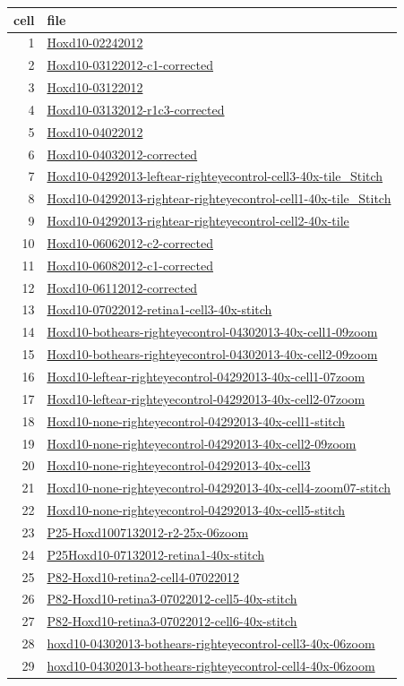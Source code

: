 \documentclass{article}
\begin{document}
\begin{table}
  \centering
  \begin{tabular}{rl}
    \toprule
    cell & file \\
    \midrule
1& \url{Hoxd10-02242012} \\
2& \url{Hoxd10-03122012-c1-corrected} \\
3& \url{Hoxd10-03122012} \\
4& \url{Hoxd10-03132012-r1c3-corrected} \\
5& \url{Hoxd10-04022012} \\
6& \url{Hoxd10-04032012-corrected} \\
7& \url{Hoxd10-04292013-leftear-righteyecontrol-cell3-40x-tile_Stitch} \\
8&
\url{Hoxd10-04292013-rightear-righteyecontrol-cell1-40x-tile_Stitch} \\
9& \url{Hoxd10-04292013-rightear-righteyecontrol-cell2-40x-tile} \\
10& \url{Hoxd10-06062012-c2-corrected} \\
11& \url{Hoxd10-06082012-c1-corrected} \\
12& \url{Hoxd10-06112012-corrected} \\
13& \url{Hoxd10-07022012-retina1-cell3-40x-stitch} \\
14& \url{Hoxd10-bothears-righteyecontrol-04302013-40x-cell1-09zoom} \\
15& \url{Hoxd10-bothears-righteyecontrol-04302013-40x-cell2-09zoom} \\
16& \url{Hoxd10-leftear-righteyecontrol-04292013-40x-cell1-07zoom} \\
17& \url{Hoxd10-leftear-righteyecontrol-04292013-40x-cell2-07zoom} \\
18& \url{Hoxd10-none-righteyecontrol-04292013-40x-cell1-stitch} \\
19& \url{Hoxd10-none-righteyecontrol-04292013-40x-cell2-09zoom} \\
20& \url{Hoxd10-none-righteyecontrol-04292013-40x-cell3} \\
21& \url{Hoxd10-none-righteyecontrol-04292013-40x-cell4-zoom07-stitch} \\
22& \url{Hoxd10-none-righteyecontrol-04292013-40x-cell5-stitch} \\
23& \url{P25-Hoxd1007132012-r2-25x-06zoom} \\
24& \url{P25Hoxd10-07132012-retina1-40x-stitch} \\
25& \url{P82-Hoxd10-retina2-cell4-07022012} \\
26& \url{P82-Hoxd10-retina3-07022012-cell5-40x-stitch} \\
27& \url{P82-Hoxd10-retina3-07022012-cell6-40x-stitch} \\
28& \url{hoxd10-04302013-bothears-righteyecontrol-cell3-40x-06zoom} \\
29& \url{hoxd10-04302013-bothears-righteyecontrol-cell4-40x-06zoom} \\
\bottomrule
  \end{tabular}
\end{table}
\end{document}
